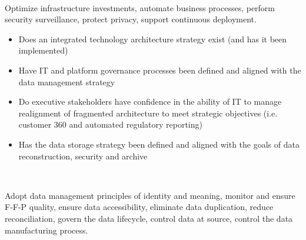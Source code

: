 \begin{description}[nosep,font=\bfseries]
  ~\\

  \item [High-Level Technology Goals]
  Optimize infrastructure investments, automate business processes, 
  perform security surveillance, protect privacy, support continuous deployment. \\

  \begin{itemize}
    \item Does an integrated technology architecture strategy exist (and has it been implemented)
    \item Have IT and platform governance processes been defined and aligned with the data management strategy
    \item Do executive stakeholders have confidence in the ability of IT to manage realignment of fragmented architecture to meet strategic objectives (i.e. customer 360 and automated regulatory reporting)
    \item Has the data storage strategy been defined and aligned with the goals of data reconstruction, security and archive
  \end{itemize}

  ~\\

  \item [High-Level Data Goals]
  Adopt data management principles of identity and meaning, 
  monitor and ensure F-F-P quality, ensure data accessibility, 
  eliminate data duplication, reduce reconciliation, 
  govern the data lifecycle, control data at source, 
  control the data manufacturing process. \\


\end{description}
